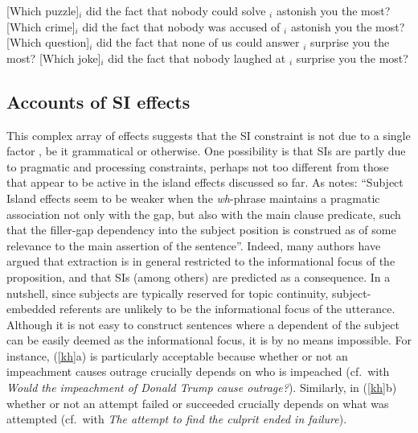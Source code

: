\documentclass[output=paper,biblatex,babelshorthands,newtxmath,draftmode,colorlinks,citecolor=brown]{langscibook}
\begin{document}
\eal \label{excz}
\ex {}[Which puzzle]$_i$ did the fact that nobody could solve \trace$_i$ astonish you the most?
\ex {}[Which crime]$_i$ did the fact that nobody was accused of \trace$_i$ astonish you the most?
\ex {}[Which question]$_i$ did the fact that none of us could answer \trace$_i$  surprise you the most?
\ex {}[Which joke]$_i$ did the fact that nobody laughed at \trace$_i$ surprise you the most?
\zl

\subsection{Accounts of SI effects}

This complex array of effects suggests that the SI constraint is not due to a single factor
\citep{chomsky08,chavessubj,fernandez}, be it grammatical or otherwise.  One possibility is that SIs
are partly due to pragmatic and processing constraints, perhaps not too different from those that
appear to be active in the island effects discussed so far. As \citet[495]{kluender06} notes:
``Subject Island effects seem to be weaker when the \emph{wh}-phrase maintains a pragmatic
association not only with the gap, but also with the main clause predicate, such that the filler-gap
dependency into the subject position is construed as of some relevance to the main assertion of the
sentence''. Indeed, many authors \citep{shir-jrn,valin86,kuno87,ken,Dean,goldberg13} have argued
that extraction is in general restricted to the informational focus of the proposition, and that SIs
(among others) are predicted as a consequence. In a nutshell, since subjects are typically reserved
for topic continuity, subject-embedded referents are unlikely to be the informational focus of the
utterance.  Although it is not easy to construct sentences where a dependent of the subject can be
easily deemed as the informational focus, it is by no means impossible.  For instance, (\ref{kh}a)
is particularly acceptable because whether or not an impeachment causes outrage crucially depends on
who is impeached (cf.\ with \emph{Would the impeachment of Donald Trump cause outrage?}). Similarly,
in (\ref{kh}b) whether or not an attempt failed or succeeded crucially depends on what was attempted
(cf.\ with \emph{The attempt to find the culprit ended in failure}).
\end{document}
